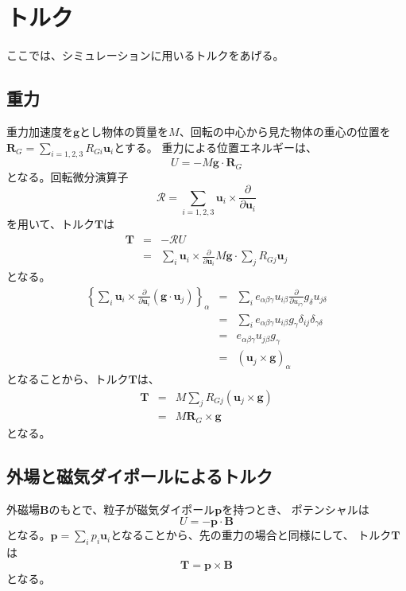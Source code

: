 \documentclass[a4paper,11pt]{jbook}
\def\vecR {\bm {\mathcal {R} } }
\begin{document}
\section{トルク}
ここでは、シミュレーションに用いるトルクをあげる。
\subsection{重力}
重力加速度を$\bm{g}$とし物体の質量を$M$、回転の中心から見た物体の重心の位置を$\bm{R}_G=\sum_{i=1,2,3}R_{G i}\bm{u}_i$とする。
重力による位置エネルギーは、
\begin{equation}
U=-M\bm{g}\cdot\bm{R}_G
\end{equation}
となる。回転微分演算子
\begin{equation}
\vecR=\sum_{i=1,2,3}\bm{u}_i\times\frac{\partial}{\partial \bm{u}_i}
\end{equation}
を用いて、トルク$\bm{T}$は
\begin{eqnarray}
\bm{T}&=&-\vecR U \nonumber \\
&=& \sum_i \bm{u}_i\times\frac{\partial}{\partial \bm{u}_i}M\bm{g}\cdot\sum_jR_{G j}\bm{u}_j
\end{eqnarray}
となる。
\begin{eqnarray}
\left\{\sum_i\bm{u}_i\times\frac{\partial}{\partial \bm{u}_i}\left(\bm{g}\cdot\bm{u}_j\right)
\right\}_\alpha
&=& \sum_i e_{\alpha\beta\gamma}u_{i\beta}\frac{\partial}{\partial u_{i\gamma}}g_{\delta} u_{j\delta}\nonumber\\
&=& \sum_i e_{\alpha\beta\gamma}u_{i\beta}g_{\gamma}\delta_{ij}\delta_{\gamma\delta}\nonumber\\
&=&e_{\alpha\beta\gamma}u_{j\beta}g_{\gamma}\nonumber \\
&=&(\bm{u}_j\times\bm{g})_{\alpha}
\end{eqnarray}
となることから、トルク$\bm{T}$は、
\begin{eqnarray}
\bm{T}&=&M\sum_jR_{Gj}(\bm{u}_j\times\bm{g})\nonumber \\
&=&M\bm{R}_G\times\bm{g}
\end{eqnarray}
となる。
\subsection{外場と磁気ダイポールによるトルク}
外磁場$\bm{B}$のもとで、粒子が磁気ダイポール$\bm{p}$を持つとき、
ポテンシャルは
\begin{equation}
U=-\bm{p}\cdot\bm{B}
\end{equation}
となる。$\bm{p}=\sum_ip_i\bm{u}_i$となることから、先の重力の場合と同様にして、
トルク$\bm{T}$は
\begin{equation}
\bm{T}=\bm{p}\times\bm{B}
\end{equation}
となる。
\end{document}
